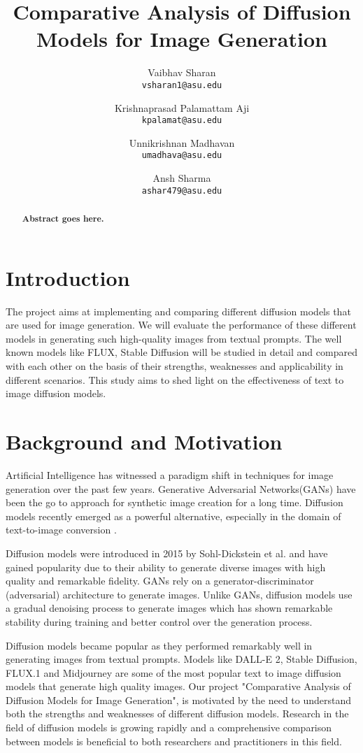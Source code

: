 \documentclass{article}
\title{Comparative Analysis of Diffusion Models for Image Generation
}
\author{
  Vaibhav Sharan\\
  \texttt{vsharan1@asu.edu} \\ 
  \and
  Krishnaprasad Palamattam Aji\\
  \texttt{kpalamat@asu.edu}\\
  \and
  Unnikrishnan Madhavan\\
  \texttt{umadhava@asu.edu}\\
  \and
  Ansh Sharma\\
  \texttt{ashar479@asu.edu}
}
\begin{document}
\maketitle

\begin{abstract}
    \textbf{Abstract goes here.}
\end{abstract}

\section{Introduction}
The project aims at implementing and comparing different diffusion models that are used for 
image generation. We will evaluate the performance of these different models in generating
such high-quality images from textual prompts. The well known models like FLUX, Stable
Diffusion will be studied in detail and compared with each other on the basis of
their strengths, weaknesses and applicability in different scenarios. This study aims to shed light
on the effectiveness of text to image diffusion models.


\section{Background and Motivation}
Artificial Intelligence has witnessed a paradigm shift in techniques for image generation over the past few years. 
Generative Adversarial Networks(GANs) have been the go to approach for synthetic image creation for a long time. 
Diffusion models recently emerged as a powerful alternative, especially in the domain of text-to-image conversion \cite{dhariwal2021}. 

Diffusion models were introduced in 2015 by Sohl-Dickstein et al.\cite{sohl2015} and have gained popularity 
due to their ability to generate diverse images with high quality and remarkable fidelity. GANs rely on a 
generator-discriminator (adversarial) architecture to generate images. Unlike GANs, diffusion models use a 
gradual denoising process to generate images which has shown remarkable stability during training and better control
over the generation process.

Diffusion models became popular as they performed remarkably well in generating images from textual prompts. Models like DALL-E 2,
Stable Diffusion, FLUX.1 and Midjourney are some of the most popular text to image diffusion models that generate high quality images. 
Our project "Comparative Analysis of Diffusion Models for Image Generation", is motivated by the 
need to understand both the strengths and weaknesses of different diffusion models. Research in the field of diffusion models 
is growing rapidly and a comprehensive comparison between models is beneficial to both researchers and practitioners in this field.
\end{document}

